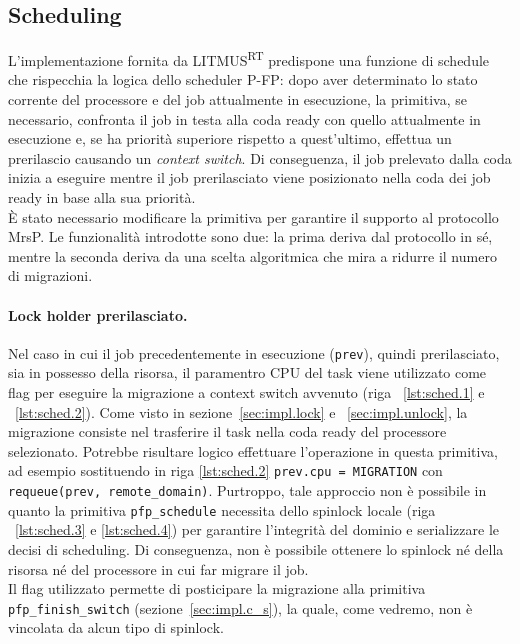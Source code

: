 \subsection{Scheduling}
\label{sec:impl.schedule}

L'implementazione fornita da LITMUS\textsuperscript{RT} predispone una funzione di schedule che rispecchia la logica dello scheduler P-FP: dopo aver determinato lo stato corrente del processore e del job attualmente in esecuzione, la primitiva, se necessario, confronta il job in testa alla coda ready con quello attualmente in esecuzione e, se ha priorità superiore rispetto a quest'ultimo, effettua un prerilascio causando un \textit{context switch}. Di conseguenza, il job prelevato dalla coda inizia a eseguire mentre il job prerilasciato viene posizionato nella coda dei job ready in base alla sua priorità.\\

\`E stato necessario modificare la primitiva per garantire il supporto al protocollo MrsP. Le funzionalità introdotte sono due: la prima deriva dal protocollo in sé, mentre la seconda deriva da una scelta algoritmica che mira a ridurre il numero di migrazioni.\\

\paragraph{Lock holder prerilasciato.} Nel caso in cui il job precedentemente in esecuzione (\texttt{prev}), quindi prerilasciato, sia in possesso della risorsa, il paramentro CPU del task viene utilizzato come flag per eseguire la migrazione a context switch avvenuto (riga ~\ref{lst:sched.1} e ~\ref{lst:sched.2}). Come visto in sezione~\ref{sec:impl.lock} e ~\ref{sec:impl.unlock}, la migrazione consiste nel trasferire il task nella coda ready del processore selezionato. Potrebbe risultare logico effettuare l'operazione in questa primitiva, ad esempio sostituendo in riga \ref{lst:sched.2} \texttt{prev.cpu = MIGRATION} con \texttt{requeue(prev, remote\_domain)}. Purtroppo, tale approccio non è possibile in quanto la primitiva \texttt{pfp\_schedule} necessita dello spinlock locale (riga ~\ref{lst:sched.3} e \ref{lst:sched.4}) per garantire l'integrità del dominio e serializzare le decisi di scheduling. Di conseguenza, non è possibile ottenere lo spinlock né della risorsa né del processore in cui far migrare il job.\\
Il flag utilizzato permette di posticipare la migrazione alla primitiva \texttt{pfp\_finish\_switch} (sezione~\ref{sec:impl.c_s}), la quale, come vedremo, non è vincolata da alcun tipo di spinlock.\\

